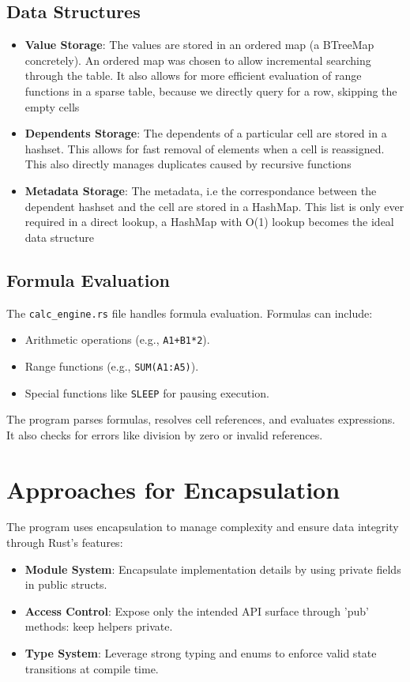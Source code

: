 \documentclass[12pt]{article}
\begin{document}
\subsection{Data Structures}
\begin{itemize}
    \item \textbf{Value Storage}: The values are stored in an ordered map (a BTreeMap concretely). An ordered map was chosen to allow incremental searching through the table. It also allows for more efficient evaluation of range functions in a sparse table, because we directly query for a row, skipping the empty cells
    \item \textbf{Dependents Storage}: The dependents of a particular cell are stored in a hashset. This allows for fast removal of elements when a cell is reassigned. This also directly manages duplicates caused by recursive functions
    \item \textbf{Metadata Storage}: The metadata, i.e the correspondance between the dependent hashset and the cell are stored in a HashMap. This list is only ever required in a direct lookup, a HashMap with O(1) lookup becomes the ideal data structure 
\end{itemize}

\subsection{Formula Evaluation}
The \texttt{calc\_engine.rs} file handles formula evaluation. Formulas can include:
\begin{itemize}
\item Arithmetic operations (e.g., \texttt{A1+B1*2}).
\item Range functions (e.g., \texttt{SUM(A1:A5)}).
\item Special functions like \texttt{SLEEP} for pausing execution.
\end{itemize}

The program parses formulas, resolves cell references, and evaluates expressions. It also
checks for errors like division by zero or invalid references.

\section{Approaches for Encapsulation}
The program uses encapsulation to manage complexity and ensure data integrity through
Rust's features:
\begin{itemize}
\item \textbf{Module System}: Encapsulate implementation details by using private fields in public structs. 
\item  \textbf{Access Control}: Expose only the intended API surface through 'pub' methods: keep helpers private. 
\item  \textbf{Type System}: Leverage strong typing and enums to enforce valid state transitions at compile time.
\end{itemize}
\end{document}
